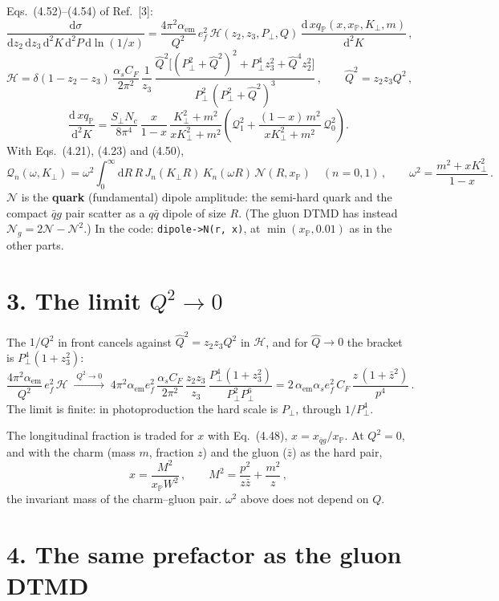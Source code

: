 \documentclass[12pt]{article}
\newcommand{\xpo}{x_{\mathbb{P}}}
\newcommand{\dd}{\mathrm{d}}
\begin{document}
Eqs.~(4.52)--(4.54) of Ref.~[3]:
\[
  \frac{\dd\sigma}{\dd z_2\,\dd z_3\,\dd^2K\,\dd^2P\,\dd\ln(1/x)}
  =\frac{4\pi^2\alpha_{\mathrm{em}}}{Q^2}\,e_f^2\,\mathcal{H}(z_2,z_3,P_\perp,Q)\,
  \frac{\dd\,x q_{\mathbb{P}}(x,\xpo,K_\perp,m)}{\dd^2K}\,,
\]
\[
  \mathcal{H}=\delta(1-z_2-z_3)\,\frac{\alpha_s C_F}{2\pi^2}\,\frac{1}{z_3}\,
  \frac{\hat Q^2\big[(P_\perp^2+\hat Q^2)^2+P_\perp^4z_3^2+\hat Q^4z_2^2\big]}{P_\perp^2\,(P_\perp^2+\hat Q^2)^3}\,,
  \qquad \hat Q^2=z_2z_3Q^2\,,
\]
\[
  \frac{\dd\,x q_{\mathbb{P}}}{\dd^2K}=\frac{S_\perp N_c}{8\pi^4}\,\frac{x}{1-x}\,
  \frac{K_\perp^2+m^2}{xK_\perp^2+m^2}
  \left(\mathcal{Q}_1^2+\frac{(1-x)\,m^2}{xK_\perp^2+m^2}\,\mathcal{Q}_0^2\right).
\]
With Eqs.~(4.21), (4.23) and (4.50),
\[
  \mathcal{Q}_n(\omega,K_\perp)=\omega^2\int_0^\infty\dd R\,R\,J_n(K_\perp R)\,K_n(\omega R)\,
  \mathcal{N}(R,\xpo)\quad(n=0,1)\,,\qquad
  \omega^2=\frac{m^2+xK_\perp^2}{1-x}\,.
\]
$\mathcal{N}$ is the \textbf{quark} (fundamental) dipole amplitude: the semi-hard quark and the compact
$\bar qg$ pair scatter as a $q\bar q$ dipole of size $R$. (The gluon DTMD has instead
$\mathcal{N}_g=2\mathcal{N}-\mathcal{N}^2$.) In the code: \texttt{dipole->N(r, x)}, at
$\min(\xpo,0.01)$ as in the other parts.

\section*{3. The limit $Q^2\to0$}

The $1/Q^2$ in front cancels against $\hat Q^2=z_2z_3Q^2$ in $\mathcal{H}$, and for $\hat Q\to0$ the
bracket is $P_\perp^4(1+z_3^2)$:
\[
  \frac{4\pi^2\alpha_{\mathrm{em}}}{Q^2}\,e_f^2\,\mathcal{H}\;\xrightarrow{\;Q^2\to0\;}\;
  4\pi^2\alpha_{\mathrm{em}}e_f^2\,\frac{\alpha_sC_F}{2\pi^2}\,\frac{z_2z_3}{z_3}\,
  \frac{P_\perp^4(1+z_3^2)}{P_\perp^2P_\perp^6}
  =2\,\alpha_{\mathrm{em}}\alpha_s e_f^2\,C_F\,\frac{z\,(1+\bar z^2)}{p^4}\,.
\]
The limit is finite: in photoproduction the hard scale is $P_\perp$, through $1/P_\perp^4$.

The longitudinal fraction is traded for $x$ with Eq.~(4.48), $x=x_{\bar qg}/\xpo$. At $Q^2=0$, and with
the charm (mass $m$, fraction $z$) and the gluon ($\bar z$) as the hard pair,
\[
  x=\frac{M^2}{\xpo W^2}\,,\qquad M^2=\frac{p^2}{z\bar z}+\frac{m^2}{z}\,,
\]
the invariant mass of the charm--gluon pair. $\omega^2$ above does not depend on $Q$.

\section*{4. The same prefactor as the gluon DTMD}
\end{document}
